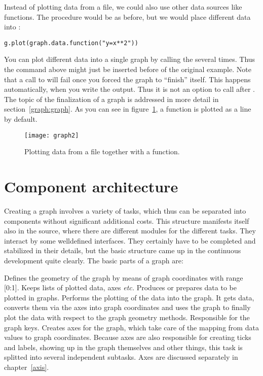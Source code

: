 Instead of plotting data from a file, we could also use other data
sources like functions. The procedure would be as before, but we would
place different data into :
\begin{verbatim}
g.plot(graph.data.function("y=x**2"))
\end{verbatim}
You can plot different data into a single graph by calling the
 several times. Thus the command above might just be
inserted before  of the original example.
Note that a call to  will fail once you forced the
graph to ``finish'' itself. This happens automatically, when you
write the output. Thus it is not an option to call 
after . The topic of the finalization of a
graph is addressed in more detail in section~\ref{graph:graph}. As
you can see in figure~\ref{fig:graph2}, a function is plotted as a
line by default.
\begin{figure}[ht]
\centerline{\texttt{[image: graph2]}}
\caption{Plotting data from a file together with a function.}
\label{fig:graph2}
\end{figure}

\section{Component architecture \label{graph:components}}

Creating a graph involves a variety of tasks, which thus can be
separated into components without significant additional costs.
This structure manifests itself also in the \PyX{} source, where there
are different modules for the different tasks. They interact by some
welldefined interfaces. They certainly have to be completed and
stabilized in their details, but the basic structure came up in the
continuous development quite clearly. The basic parts of a graph are:

\begin{definitions}
  Defines the geometry of the graph by means of graph coordinates with
  range [0:1]. Keeps lists of plotted data, axes \emph{etc.}
  Produces or prepares data to be plotted in graphs.
  Performs the plotting of the data into the graph. It gets data,
  converts them via the axes into graph coordinates and uses the graph
  to finally plot the data with respect to the graph geometry methods.
  Responsible for the graph keys.
  Creates axes for the graph, which take care of the mapping from data
  values to graph coordinates. Because axes are also responsible for
  creating ticks and labels, showing up in the graph themselves and
  other things, this task is splitted into several independent
  subtasks. Axes are discussed separately in chapter~\ref{axis}.
\end{definitions}

